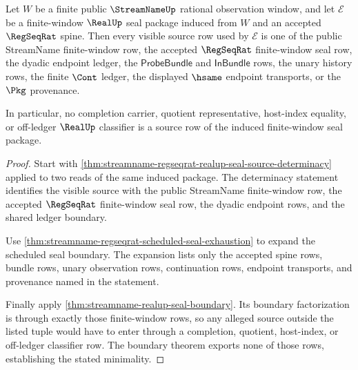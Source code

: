 \begin{theorem}
\label{thm:streamname-regseqrat-realup-seal-source-minimality}
Let $W$ be a finite public $\StreamNameUp$ rational observation window, and
let $\mathcal{E}$ be a finite-window $\RealUp$ seal package induced from $W$
and an accepted $\RegSeqRat$ spine. Then every visible source row used by
$\mathcal{E}$ is one of the public StreamName finite-window row, the accepted
$\RegSeqRat$ finite-window seal row, the dyadic endpoint ledger, the
$\mathsf{ProbeBundle}$ and $\mathsf{InBundle}$ rows, the unary history rows,
the finite $\Cont$ ledger, the displayed $\hsame$ endpoint transports, or the
$\Pkg$ provenance.

In particular, no completion carrier, quotient representative, host-index
equality, or off-ledger $\RealUp$ classifier is a source row of the induced
finite-window seal package.
\end{theorem}
\begin{proof}
Start with
\autoref{thm:streamname-regseqrat-realup-seal-source-determinacy} applied to
two reads of the same induced package. The determinacy statement identifies
the visible source with the public StreamName finite-window row, the accepted
$\RegSeqRat$ finite-window seal row, the dyadic endpoint rows, and the shared
ledger boundary.

Use \autoref{thm:streamname-regseqrat-scheduled-seal-exhaustion} to expand the
scheduled seal boundary. The expansion lists only the accepted spine rows,
bundle rows, unary observation rows, continuation rows, endpoint transports,
and provenance named in the statement.

Finally apply \autoref{thm:streamname-realup-seal-boundary}. Its boundary
factorization is through exactly those finite-window rows, so any alleged
source outside the listed tuple would have to enter through a completion,
quotient, host-index, or off-ledger classifier row. The boundary theorem
exports none of those rows, establishing the stated minimality.
\end{proof}

